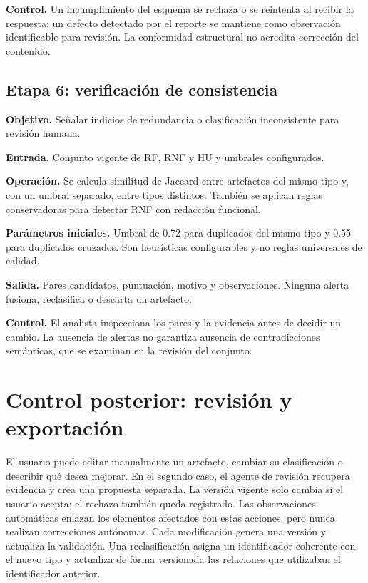 \textbf{Control.} Un incumplimiento del esquema se rechaza o se reintenta al recibir la respuesta; un defecto detectado por el reporte se mantiene como observación identificable para revisión. La conformidad estructural no acredita corrección del contenido.

\subsection{Etapa 6: verificación de consistencia}

\textbf{Objetivo.} Señalar indicios de redundancia o clasificación inconsistente para revisión humana.

\textbf{Entrada.} Conjunto vigente de RF, RNF y HU y umbrales configurados.

\textbf{Operación.} Se calcula similitud de Jaccard entre artefactos del mismo tipo y, con un umbral separado, entre tipos distintos. También se aplican reglas conservadoras para detectar RNF con redacción funcional.

\textbf{Parámetros iniciales.} Umbral de 0.72 para duplicados del mismo tipo y 0.55 para duplicados cruzados. Son heurísticas configurables y no reglas universales de calidad.

\textbf{Salida.} Pares candidatos, puntuación, motivo y observaciones. Ninguna alerta fusiona, reclasifica o descarta un artefacto.

\textbf{Control.} El analista inspecciona los pares y la evidencia antes de decidir un cambio. La ausencia de alertas no garantiza ausencia de contradicciones semánticas, que se examinan en la revisión del conjunto.

\section{Control posterior: revisión y exportación}

El usuario puede editar manualmente un artefacto, cambiar su clasificación o describir qué desea mejorar. En el segundo caso, el agente de revisión recupera evidencia y crea una propuesta separada. La versión vigente solo cambia si el usuario acepta; el rechazo también queda registrado. Las observaciones automáticas enlazan los elementos afectados con estas acciones, pero nunca realizan correcciones autónomas. Cada modificación genera una versión y actualiza la validación. Una reclasificación asigna un identificador coherente con el nuevo tipo y actualiza de forma versionada las relaciones que utilizaban el identificador anterior.

